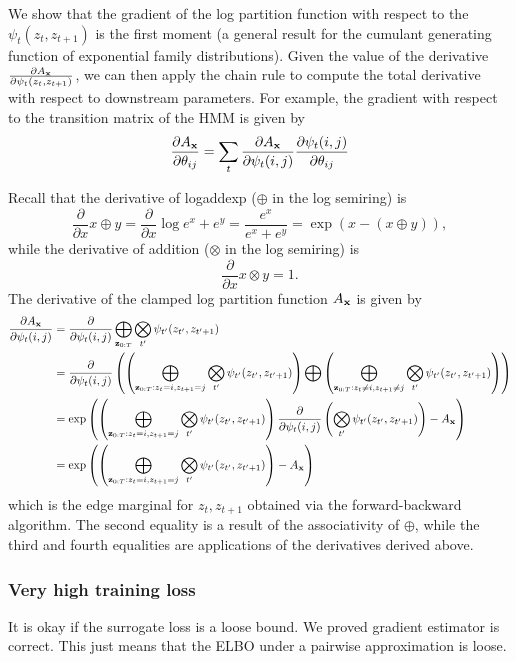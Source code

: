 \documentclass[12pt]{article}
\begin{document}
We show that the gradient of the log partition function with respect to the $\psi_t(z_t, z_{t+1})$
is the first moment (a general result for the cumulant generating function
of exponential family distributions). Given the value of the derivative
$\frac{\partial A_{\mathbf{x}}}{\partial \psi_t(z_t, z_{t+1})}$,
we can then apply the chain rule to compute the total derivative with respect to
downstream parameters. For example, the gradient with respect to the transition matrix
of the HMM is given by
$$\frac{\partial A_{\mathbf{x}}}{\partial \theta_{ij}}
= \sum_t \frac{\partial A_{\mathbf{x}}}{\partial \psi_t(i,j)}
\frac{\partial \psi_t(i,j)}{\partial \theta_{ij}}$$

Recall that the derivative of logaddexp ($\oplus$ in the log semiring) is
$$\frac{\partial}{\partial x} x \oplus y
= \frac{\partial}{\partial x} \log e^x + e^ y
= \frac{e^x}{e^x + e^y}
= \exp(x - (x \oplus y))
,$$
while the derivative of addition ($\otimes$ in the log semiring) is
$$\frac{\partial}{\partial x} x \otimes y = 1.$$
The derivative of the clamped log partition function $A_{\mathbf{x}}$ is given by
\begin{align*}
\frac{\partial A_{\mathbf{x}}}{\partial \psi_t(i,j)}
&= \frac{\partial}{\partial \psi_t(i,j)} \bigoplus_{\mathbf{z}_{0:T}}
    \bigotimes_{t'} \psi_{t'}(z_{t'}, z_{t'+1})\\
&= \frac{\partial}{\partial \psi_t(i,j)} \left(
        \left(\bigoplus_{\mathbf{z}_{0:T}:z_t = i, z_{t+1} = j}
        \bigotimes_{t'} \psi_{t'}(z_{t'}, z_{t'+1})\right)
        \bigoplus
        \left(\bigoplus_{\mathbf{z}_{0:T}:z_t \ne i, z_{t+1} \ne j}
        \bigotimes_{t'} \psi_{t'}(z_{t'}, z_{t'+1})\right)
    \right)\\
&= \exp\left(\left(\bigoplus_{\mathbf{z}_{0:T}:z_t = i, z_{t+1} = j} 
    \bigotimes_{t'} \psi_{t'}(z_{t'}, z_{t'+1})\right)
    \frac{\partial}{\partial \psi_t(i,j)}\left(\bigotimes_{t'} \psi_{t'}(z_{t'}, z_{t'+1})\right)
    - A_{\mathbf{x}}\right)\\
&= \exp\left(\left(\bigoplus_{\mathbf{z}_{0:T}:z_t = i, z_{t+1} = j} 
    \bigotimes_{t'} \psi_{t'}(z_{t'}, z_{t'+1})\right)
    - A_{\mathbf{x}}\right)
\end{align*} 
which is the edge marginal for $z_t, z_{t+1}$ obtained via the forward-backward algorithm.
The second equality is a result of the associativity of $\oplus$,
while the third and fourth equalities are applications of the derivatives
derived above.

\subsubsection{Very high training loss}
It is okay if the surrogate loss is a loose bound.
We proved gradient estimator is correct.
This just means that the ELBO under a pairwise approximation is loose.
\end{document}
